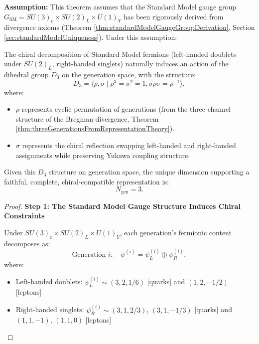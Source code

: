 \begin{theorem}
\label{thm:gaugeToDihedralStructure}

\textbf{Assumption:} This theorem assumes that the Standard Model gauge group $G_{\text{SM}} = SU(3)_c \times SU(2)_L \times U(1)_Y$ has been rigorously derived from divergence axioms (Theorem \ref{thm:standardModelGaugeGroupDerivation}, Section \ref{sec:standardModelUniqueness}). Under this assumption:

The chiral decomposition of Standard Model fermions (left-handed doublets under $SU(2)_L$, right-handed singlets) naturally induces an action of the dihedral group $D_3$ on the generation space, with the structure:
\begin{equation}
D_3 = \langle \rho, \sigma \mid \rho^3 = \sigma^2 = 1, \sigma\rho\sigma = \rho^{-1} \rangle,
\end{equation}
where:
\begin{itemize}
\item $\rho$ represents cyclic permutation of generations (from the three-channel structure of the Bregman divergence, Theorem \ref{thm:threeGenerationsFromRepresentationTheory}).
\item $\sigma$ represents the chiral reflection swapping left-handed and right-handed assignments while preserving Yukawa coupling structure.
\end{itemize}

Given this $D_3$ structure on generation space, the unique dimension supporting a faithful, complete, chiral-compatible representation is:
\begin{equation}
N_{\mathrm{gen}} = 3.
\end{equation}

\begin{proof}

\textbf{Step 1: The Standard Model Gauge Structure Induces Chiral Constraints}

Under $SU(3)_c \times SU(2)_L \times U(1)_Y$, each generation's fermionic content decomposes as:
\begin{equation}
\text{Generation } i: \quad \psi^{(i)} = \psi^{(i)}_L \oplus \psi^{(i)}_R,
\end{equation}
where:
\begin{itemize}
\item Left-handed doublets: $\psi^{(i)}_L \sim (3, 2, 1/6)$ [quarks] and $(1, 2, -1/2)$ [leptons]
\item Right-handed singlets: $\psi^{(i)}_R \sim (3, 1, 2/3)$, $(3, 1, -1/3)$ [quarks] and $(1, 1, -1)$, $(1, 1, 0)$ [leptons]
\end{itemize}


\end{proof}
\end{theorem}
